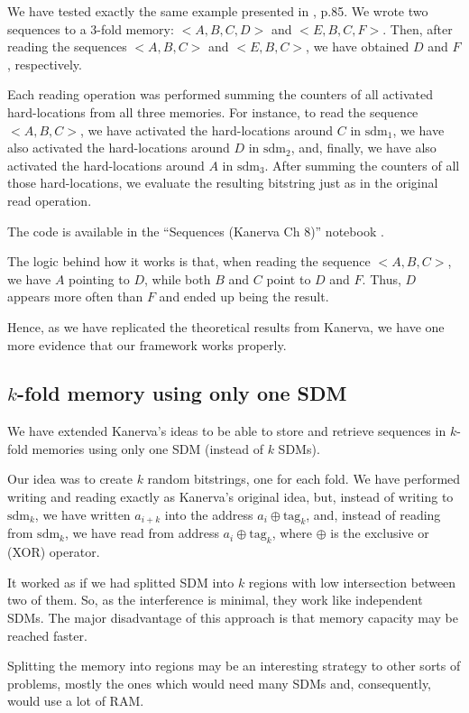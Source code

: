 We have tested exactly the same example presented in \citet{Kanerva1988}, p.85. We wrote two sequences to a $3$-fold memory: $<A, B, C, D>$ and $<E, B, C, F>$. Then, after reading the sequences $<A, B, C>$ and $<E, B, C>$, we have obtained $D$ and $F$, respectively.

Each reading operation was performed summing the counters of all activated hard-locations from all three memories. For instance, to read the sequence $<A, B, C>$, we have activated the hard-locations around $C$ in $\text{sdm}_1$, we have also activated the hard-locations around $D$ in $\text{sdm}_2$, and, finally, we have also activated the hard-locations around $A$ in $\text{sdm}_3$. After summing the counters of all those hard-locations, we evaluate the resulting bitstring just as in the original read operation.

The code is available in the ``Sequences (Kanerva Ch 8)'' notebook \citep{sdmframework}.

The logic behind how it works is that, when reading the sequence $<A, B, C>$, we have $A$ pointing to $D$, while both $B$ and $C$ point to $D$ and $F$. Thus, $D$ appears more often than $F$ and ended up being the result.

Hence, as we have replicated the theoretical results from Kanerva, we have one more evidence that our framework works properly.

\subsection{$k$-fold memory using only one SDM}

We have extended Kanerva's ideas to be able to store and retrieve sequences in $k$-fold memories using only one SDM (instead of $k$ SDMs).

Our idea was to create $k$ random bitstrings, one for each fold. We have performed writing and reading exactly as Kanerva's original idea, but, instead of writing to $\text{sdm}_k$, we have written $a_{i+k}$ into the address $a_i \oplus \text{tag}_k$, and, instead of reading from $\text{sdm}_k$, we have read from address $a_i \oplus \text{tag}_k$, where $\oplus$ is the exclusive or (XOR) operator.

It worked as if we had splitted SDM into $k$ regions with low intersection between two of them. So, as the interference is minimal, they work like independent SDMs. The major disadvantage of this approach is that memory capacity may be reached faster.

Splitting the memory into regions may be an interesting strategy to other sorts of problems, mostly the ones which would need many SDMs and, consequently, would use a lot of RAM.


